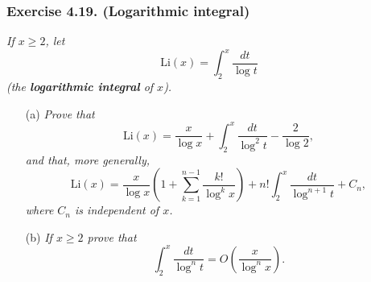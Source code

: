 \documentclass{article}
\begin{document}
\subsubsection*{Exercise 4.19. (Logarithmic integral)}
\emph{If $x \geq 2$, let
\[
  \mathrm{Li}(x) = \int_{2}^{x} \frac{dt}{\log t}
\]
(the \textbf{logarithmic integral} of $x$).}
\begin{enumerate}
\item[(a)]
  \emph{Prove that
  \[
    \mathrm{Li}(x)
    = \frac{x}{\log x} + \int_{2}^{x} \frac{dt}{\log^{2}t} - \frac{2}{\log 2},
  \]
  and that, more generally,
  \[
    \mathrm{Li}(x)
    = \frac{x}{\log x}\left(1 + \sum_{k=1}^{n-1} \frac{k!}{\log^{k}x} \right)
        + n! \int_{2}^{x} \frac{dt}{\log^{n+1} t} + C_n,
  \]
  where $C_n$ is independent of $x$.}

\item[(b)]
  \emph{If $x \geq 2$ prove that}
  \[
    \int_{2}^{x} \frac{dt}{\log^n t} = O\left( \frac{x}{\log^{n} x} \right).
  \] \\
\end{enumerate}
\end{document}

